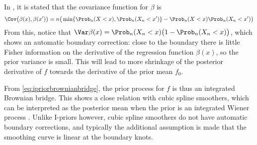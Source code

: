 In \citep{bergsma2017}, it is stated that the covariance function for $\beta$ is 
\[
  \Cov\big(\beta(x),\beta(x') \big) = n\big( \min\{\Prob_n(X < x), \Prob_n(X_n < x') \} -  \Prob_n(X < x) \Prob_n(X_n < x') \big)
\]
From this, notice that $\Var \beta(x) = \Prob_n(X_n < x)\big(1 - \Prob_n(X_n < x) \big)$, which shows an automatic boundary correction: close to the boundary there is little Fisher information on the derivative of the regression function $\beta(x)$, so the prior variance is small.
This will lead to more shrinkage of the posterior derivative of $f$ towards the derivative of the prior mean $f_0$.

\begin{remark}
  From \eqref{eq:ipriorbrownianbridge}, the prior process for $f$ is thus an integrated Brownian bridge. 
  This shows a close relation with cubic spline smoothers, which can be interpreted as the posterior mean when the prior is an integrated Wiener process \citep{wahba1990spline}.
  Unlike I-priors however, cubic spline smoothers do not have automatic boundary corrections, and typically the additional assumption is made that the smoothing curve is linear at the boundary knots.
\end{remark}



